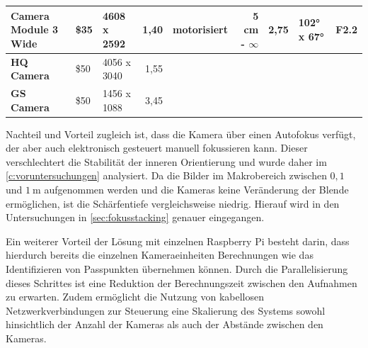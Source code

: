 \documentclass[./00PhotoBox.tex]{subfiles}
\begin{document}
\begin{table}
{\begin{tabular}{l|l|l|r|lr|r|l|r|}
            \multicolumn{1}{|l|}{\textbf{Camera Module 3 Wide}} & \$35                         & \cellcolor[HTML]{9AFF99}4608 x 2592                                  & 1,40                                                              & \multicolumn{1}{l|}{\cellcolor[HTML]{9AFF99}motorisiert}                    & \cellcolor[HTML]{9AFF99}5 cm - $\infty$                                & 2,75                     & 102° x 67°               & F2.2                         \\ \hline
            \multicolumn{1}{|l|}{\textbf{HQ Camera}}            & \cellcolor[HTML]{FFCCC9}\$50 & 4056 x 3040                                                          & 1,55                                                              & \multicolumn{1}{l|}{\cellcolor[HTML]{FFCCC9}{\color[HTML]{000000} manuell}} & \cellcolor[HTML]{C0C0C0}                                               & \cellcolor[HTML]{C0C0C0} & \cellcolor[HTML]{C0C0C0} & \cellcolor[HTML]{C0C0C0}     \\ \hline
            \multicolumn{1}{|l|}{\textbf{GS Camera}}            & \cellcolor[HTML]{FFCCC9}\$50 & 1456 x 1088                                                          & \cellcolor[HTML]{9AFF99}3,45                                      & \multicolumn{1}{l|}{\cellcolor[HTML]{FFCCC9}{\color[HTML]{000000} manuell}} & \cellcolor[HTML]{C0C0C0}                                               & \cellcolor[HTML]{C0C0C0} & \cellcolor[HTML]{C0C0C0} & \cellcolor[HTML]{C0C0C0}     \\ \hline
        \end{tabular}
    }
\end{table}

Nachteil und Vorteil zugleich ist, dass die Kamera über einen Autofokus verfügt, der aber auch elektronisch gesteuert manuell fokussieren kann. Dieser verschlechtert die Stabilität der inneren Orientierung und wurde daher im \autoref{c:voruntersuchungen} analysiert. Da die Bilder im Makrobereich zwischen $0,1$ und $1~\text{m}$ aufgenommen werden und die Kameras keine Veränderung der Blende ermöglichen, ist die Schärfentiefe vergleichsweise niedrig. Hierauf wird in den Untersuchungen in \autoref{sec:fokusstacking} genauer eingegangen.

Ein weiterer Vorteil der Lösung mit einzelnen Raspberry Pi besteht darin, dass hierdurch bereits die einzelnen Kameraeinheiten Berechnungen wie das Identifizieren von Passpunkten übernehmen können. Durch die Parallelisierung dieses Schrittes ist eine Reduktion der Berechnungszeit zwischen den Aufnahmen zu erwarten. Zudem ermöglicht die Nutzung von kabellosen Netzwerkverbindungen zur Steuerung eine Skalierung des Systems sowohl hinsichtlich der Anzahl der Kameras als auch der Abstände zwischen den Kameras.
\end{document}

